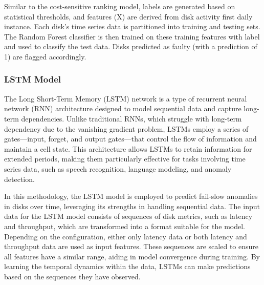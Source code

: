 \documentclass{article}
\begin{document}
\quad Similar to the cost-sensitive ranking model, labels are generated based on statistical thresholds, and features (X) are derived from disk activity first daily instance. Each disk's time series data is partitioned into training and testing sets. The Random Forest classifier is then trained on these training features with label and used to classify the test data. Disks predicted as faulty (with a prediction of 1) are flagged accordingly.

\subsubsection{LSTM Model}

\quad The Long Short-Term Memory (LSTM) network is a type of recurrent neural network (RNN) architecture designed to model sequential data and capture long-term dependencies. Unlike traditional RNNs, which struggle with long-term dependency due to the vanishing gradient problem, LSTMs employ a series of gates—input, forget, and output gates—that control the flow of information and maintain a cell state. This architecture allows LSTMs to retain information for extended periods, making them particularly effective for tasks involving time series data, such as speech recognition, language modeling, and anomaly detection.

\quad In this methodology, the LSTM model is employed to predict fail-slow anomalies in disks over time, leveraging its strengths in handling sequential data. The input data for the LSTM model consists of sequences of disk metrics, such as latency and throughput, which are transformed into a format suitable for the model. Depending on the configuration, either only latency data or both latency and throughput data are used as input features. These sequences are scaled to ensure all features have a similar range, aiding in model convergence during training. By learning the temporal dynamics within the data, LSTMs can make predictions based on the sequences they have observed.
\end{document}
